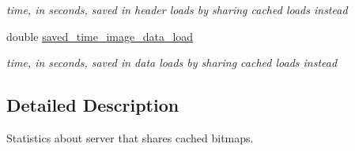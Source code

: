 \begin{DoxyCompactItemize}
\begin{DoxyCompactList}\small\item\em time, in seconds, saved in header loads by sharing cached loads instead \item\end{DoxyCompactList}\item 
double \hyperlink{struct__Evas__Cserve__Stats_a8f9d701eb8a7d84937422999ff002a1a}{saved\_\-time\_\-image\_\-data\_\-load}\label{struct__Evas__Cserve__Stats_a8f9d701eb8a7d84937422999ff002a1a}

\begin{DoxyCompactList}\small\item\em time, in seconds, saved in data loads by sharing cached loads instead \item\end{DoxyCompactList}\end{DoxyCompactItemize}


\subsection{Detailed Description}
Statistics about server that shares cached bitmaps. 